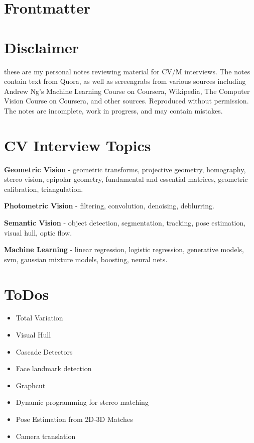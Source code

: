 \section{Frontmatter}
\label{chap:frontmatter}

\section{Disclaimer}

these are my personal notes reviewing material for CV/M interviews. The notes contain text from Quora, as well as screengrabs from various sources including Andrew Ng's Machine Learning Course on Coursera, Wikipedia, The Computer Vision Course on Coursera, and other sources. Reproduced without permission. The notes are incomplete, work in progress, and may contain mistakes.

\section{CV Interview Topics}

\textbf{Geometric Vision} - geometric transforms, projective geometry, homography, stereo vision, epipolar geometry, fundamental and essential matrices, geometric calibration, triangulation.

\textbf{Photometric Vision} - filtering, convolution, denoising, deblurring.

\textbf{Semantic Vision} - object detection, segmentation, tracking, pose estimation, visual hull, optic flow.

\textbf{Machine Learning} - linear regression, logistic regression, generative models, svm, gaussian mixture models, boosting, neural nets.

\section{ToDos}
\begin{itemize}
\item Total Variation
\item Visual Hull
\item Cascade Detectors
\item Face landmark detection
\item Graphcut
\item Dynamic programming for stereo matching
\item Pose Estimation from 2D-3D Matches
\item Camera translation
\end{itemize}
